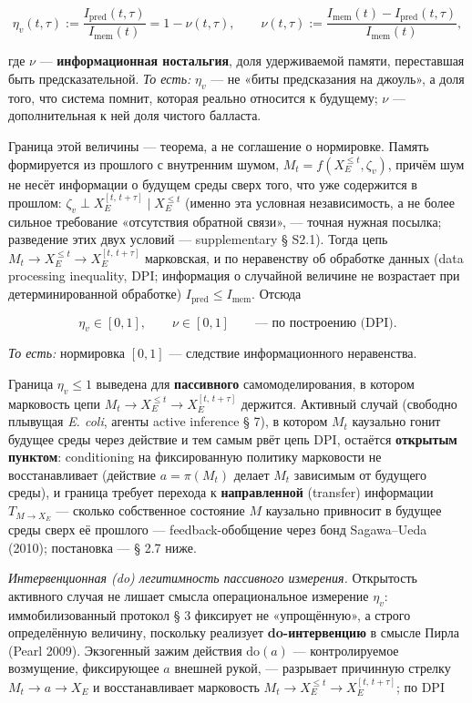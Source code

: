\documentclass[pdflatex,sn-mathphys-ay]{sn-jnl}
\begin{document}
\begin{equation}\eta_v(t,\tau) := \frac{I_{\text{pred}}(t,\tau)}{I_{\text{mem}}(t)} = 1 - \nu(t,\tau), \qquad
  \nu(t,\tau) := \frac{I_{\text{mem}}(t) - I_{\text{pred}}(t,\tau)}{I_{\text{mem}}(t)}, \tag{1}\end{equation}

где \(\nu\) --- \textbf{информационная ностальгия}, доля удерживаемой памяти, переставшая быть предсказательной. \emph{То есть:} \(\eta_v\) --- не «биты предсказания на джоуль», а доля того, что система помнит, которая реально относится к будущему; \(\nu\) --- дополнительная к ней доля чистого балласта.

Граница этой величины --- теорема, а не соглашение о нормировке. Память формируется из прошлого с внутренним шумом, \(M_t = f(X_E^{\le t}, \zeta_v)\), причём шум не несёт информации о будущем среды сверх того, что уже содержится в прошлом: \(\zeta_v \perp X_E^{[t,\,t+\tau]} \mid X_E^{\le t}\) (именно эта условная независимость, а не более сильное требование «отсутствия обратной связи», --- точная нужная посылка; разведение этих двух условий --- supplementary § S2.1). Тогда цепь \(M_t \to X_E^{\le t} \to X_E^{[t,\,t+\tau]}\) марковская, и по неравенству об обработке данных (data processing inequality, DPI; информация о случайной величине не возрастает при детерминированной обработке) \(I_{\text{pred}} \le I_{\text{mem}}\). Отсюда

\[\eta_v \in [0, 1], \qquad \nu \in [0, 1] \qquad \text{— по построению (DPI).}\]

\emph{То есть:} нормировка \([0, 1]\) --- следствие информационного неравенства.

Граница \(\eta_v \le 1\) выведена для \textbf{пассивного} самомоделирования, в котором марковость цепи \(M_t \to X_E^{\le t} \to X_E^{[t,\,t+\tau]}\) держится. Активный случай (свободно плывущая \emph{E. coli}, агенты active inference § 7), в котором \(M_t\) каузально гонит будущее среды через действие и тем самым рвёт цепь DPI, остаётся \textbf{открытым пунктом}: conditioning на фиксированную политику марковости не восстанавливает (действие \(a = \pi(M_t)\) делает \(M_t\) зависимым от будущего среды), и граница требует перехода к \textbf{направленной} (transfer) информации \(T_{M \to X_E}\) --- сколько собственное состояние \(M\) каузально привносит в будущее среды сверх её прошлого --- feedback-обобщение через бонд Sagawa--Ueda (2010); постановка --- § 2.7 ниже.

\emph{Интервенционная (do) легитимность пассивного измерения.} Открытость активного случая не лишает смысла операциональное измерение \(\eta_v\): иммобилизованный протокол § 3 фиксирует не «упрощённую», а строго определённую величину, поскольку реализует \textbf{do-интервенцию} в смысле Пирла (Pearl 2009). Экзогенный зажим действия \(\mathrm{do}(a)\) --- контролируемое возмущение, фиксирующее \(a\) внешней рукой, --- разрывает причинную стрелку \(M_t \to a \to X_E\) и восстанавливает марковость \(M_t \to X_E^{\le t} \to X_E^{[t,\,t+\tau]}\); по DPI
\end{document}
